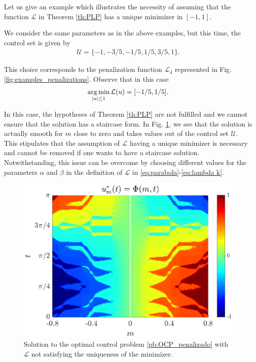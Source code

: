 \documentclass[twocolumn]{autart}    %
\begin{document}
\vspace{0.5em}
\begin{remark}\label{counterexample}
Let us give an example which illustrates the necessity of assuming that the function $\mathcal{L}$ in Theorem \ref{th:PLP} has a unique minimizer in $[-1,1]$.

We consider the same parameters as in the above examples, but this time, the control set is given by
\begin{align*}
	\mathcal{U} = \{-1,-3/5,-1/5,1/5,3/5,1\}.
\end{align*}

This choice corresponds to the penalization function $\mathcal{L}_4$ represented in Fig. \ref{fig:examples_penalizations}. Observe that in this case
\begin{align*}
	\operatorname*{arg\,min}_{|u|\leq 1} \mathcal{L}(u) = [-1/5, 1/5].
\end{align*}

In this case, the hypotheses of Theorem \ref{th:PLP} are not fulfilled and we cannot ensure that the solution has a staircase form.
In Fig. \ref{fig:sim-multi-level-par},  we see that the solution is actually smooth for $m$ close to zero and takes values out of the control set $\mathcal{U}$.  This stipulates that the assumption of $\mathcal{L}$ having a unique minimizer is necessary and cannot be removed if one wants to have a staircase solution. Notwithstanding, this issue can be overcome by choosing different values for the parameters $\alpha$ and $\beta$ in the definition of $\mathcal{L}$ in \eqref{eq:parabola}-\eqref{eq:lambda k}.

\begin{figure}[ht!]
	\hspace{0.25em}
	\includegraphics[scale=0.42]{img/fig10.eps}
	\caption{Solution to the optimal control problem \ref{pb:OCP_penalizado} with $\mathcal{L}$ not satisfying the uniqueness of the minimizer.}\label{fig:sim-multi-level-par}
\end{figure} 

\end{remark}
\end{document}
